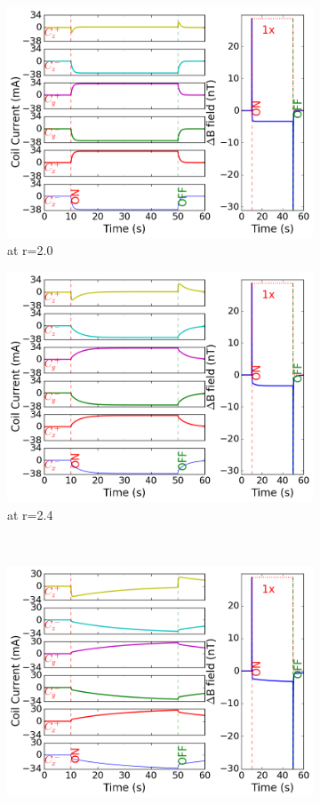 \begin{figure}[!htb]
    \begin{subfigure}{.5\linewidth}
        \centering
        \includegraphics[width=\linewidth, height= 6.5 cm]{Images/r20}
        \caption{at r=2.0}
        \label{fig:r20}
    \end{subfigure}%
    \begin{subfigure}{.5\linewidth}
        \centering
        \includegraphics[width=\linewidth, height= 6.5 cm]{Images/r24}
        \caption{at r=2.4}
        \label{fig:r24}
    \end{subfigure}\\[1ex]
    \begin{subfigure}{.5\linewidth}
        \centering
        \includegraphics[width=\linewidth, height= 6.5 cm]{Images/r28}

\end{subfigure}
\end{figure}
